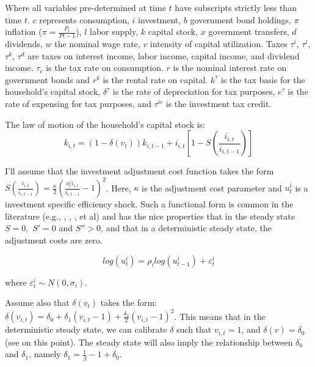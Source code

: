 \documentclass[article,11pt,letterpaper,fleqn]{article}
\theoremstyle{definition}
\numberwithin{equation}{section}
\newcommand{\cn}{\citeasnoun} %
\begin{document}
\noindent\noindent Where all variables pre-determined at time $t$ have subscripts strictly less than time $t$.  $c$ represents consumption, $i$ investment, $b$ government bond holdings, $\pi$ inflation ($\pi=\frac{P_{t}}{P{t-1}}$), $l$ labor supply, $k$ capital stock, $x$ government transfers, $d$ dividends, $w$ the nominal wage rate, $v$ intensity of capital utilization. Taxes $\tau^{i}$, $\tau^{l}$, $\tau^{k}$, $\tau^{d}$ are taxes on interest income, labor income, capital income, and dividend income.  $\tau_{c}$ is the tax rate on consumption.  $r$ is the nominal interest rate on government bonds and $r^{k}$ is the rental rate on capital.  $k^{\tau}$ is the tax basis for the household's capital stock, $\delta^{\tau}$ is the rate of depreciation for tax purposes, $e^{\tau}$ is the rate of expensing for tax purposes, and $\tau^{ic}$ is the investment tax credit.


The law of motion of the household's capital stock is:
\begin{equation}
\label{LOM_capital}
k_{i,t}=(1-\delta(v_{t}))k_{i,t-1} + i_{i,t}\left[1-S\left(\frac{i_{i,t}}{i_{i,t-1}}\right)\right]
\end{equation}

I'll assume that the investment adjustment cost function takes the form $S\left(\frac{i_{i,t}}{i_{i,t-1}}\right)=\frac{\kappa}{2}\left(\frac{u^{i}_{t}i_{i,t}}{i_{i,t-1}}-1\right)^2$.  Here, $\kappa$ is the adjustment cost parameter and $u^{i}_{t}$ is a investment specific efficiency shock.  Such a functional form is common in the literature (e.g., \cn{SW2003}, \cn{CER2010}, \cn{Zubairy2010}, et al) and has the nice properties that in the steady state $S=0,$ $S'=0$ and $S''>0$, and that in a deterministic steady state, the adjustment costs are zero. 

\begin{equation}
\label{invest_shock}
log(u^{i}_{t}) = \rho_{i}log(u^{i}_{t-1}) + \varepsilon^{i}_{t} 
\end{equation}

where $\varepsilon^{i}_{t} \sim N(0,\sigma_{i})$.

Assume also that $\delta(v_{t})$ takes the form: $\delta(v_{i,t})=\delta_{0}+\delta_{1}(v_{i,t}-1) + \frac{\delta_{2}}{2}(v_{i,t}-1)^2$.  This means that in the deterministic steady state, we can calibrate $\delta$ such that $v_{i,t}=1$, and $\delta(v)=\delta_{0}$ (see \cn{TY2010} on this point).  The steady state will also imply the relationship between $\delta_{0}$ and $\delta_{1}$, namely $\delta_{1} =  \frac{1}{\beta}-1+\delta_{0}$. 
\end{document}
